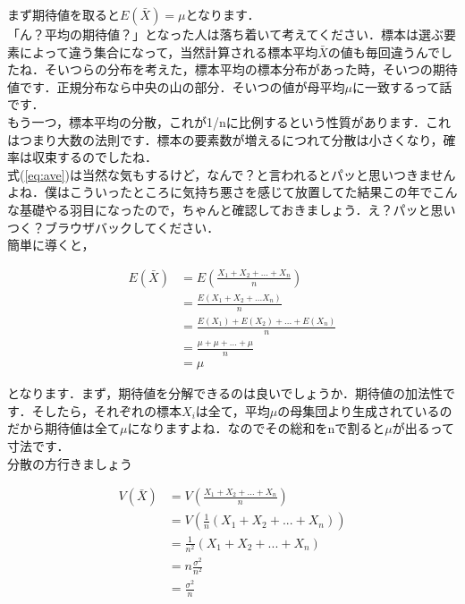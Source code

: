 \documentclass[11pt,a4paper,uplatex]{ujreport} 	%
\begin{document}
まず期待値を取ると$E(\bar{X}) = \mu$となります．\\

「ん？平均の期待値？」となった人は落ち着いて考えてください．標本は選ぶ要素によって違う集合になって，当然計算される標本平均$\bar{X}$の値も毎回違うんでしたね．そいつらの分布を考えた，標本平均の標本分布があった時，そいつの期待値です．正規分布なら中央の山の部分．そいつの値が母平均$\mu$に一致するって話です．\\

もう一つ，標本平均の分散，これが1/nに比例するという性質があります．これはつまり大数の法則です．標本の要素数が増えるにつれて分散は小さくなり，確率は収束するのでしたね．\\

式(\ref{eq:ave})は当然な気もするけど，なんで？と言われるとパッと思いつきませんよね．僕はこういったところに気持ち悪さを感じて放置してた結果この年でこんな基礎やる羽目になったので，ちゃんと確認しておきましょう．え？パッと思いつく？ブラウザバックしてください．\\

簡単に導くと，

\begin{align}
  E(\bar{X}) &= E(\frac{X_1 + X_2 + ...+X_n}{n})\\
             &= \frac{E(X_1+X_2+...X_n)}{n}\\
             &= \frac{E(X_1) + E(X_2)+...+E(X_n)}{n}\\
             &= \frac{\mu+\mu+...+\mu}{n}\\
             &=\mu 
\end{align}

となります．まず，期待値を分解できるのは良いでしょうか．期待値の加法性です．そしたら，それぞれの標本$X_i$は全て，平均$\mu$の母集団より生成されているのだから期待値は全て$\mu$になりますよね．なのでその総和をnで割ると$\mu$が出るって寸法です．\\

分散の方行きましょう

\begin{align}
  V(\bar{X}) &= V(\frac{X_1+X_2+...+X_n}{n})\\
             &= V(\frac{1}{n}(X_1 + X_2 +...+ X_n)) \\
             &= \frac{1}{n^2}(X_1 + X_2+...+X_n)\\
             &= n\frac{\sigma^2}{n^2}\\
             &= \frac{\sigma^2}{n}
\end{align}
\end{document}
